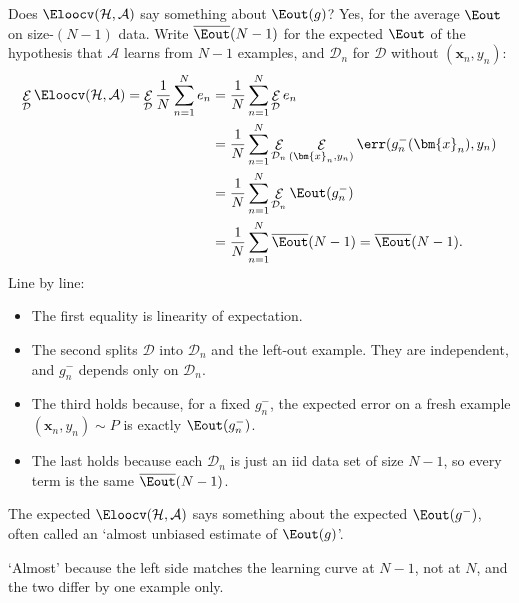 Does \(\Eloocv(\mathcal{H}, \mathcal{A})\) say something about \(\Eout(g)\)?
Yes, for the average \(\Eout\) on size-\((N - 1)\) data. Write
\(\overline{\Eout}(N - 1)\) for the expected \(\Eout\) of the hypothesis that
\(\mathcal{A}\) learns from \(N - 1\) examples, and \(\mathcal{D}_n\) for
\(\mathcal{D}\) without \((\bm{x}_n, y_n)\):
\begin{align*}
    \mathop{\mathcal{E}}_{\mathcal{D}} \Eloocv(\mathcal{H}, \mathcal{A}) =
    \mathop{\mathcal{E}}_{\mathcal{D}} \frac{1}{N} \sum_{n=1}^{N} e_n &=
    \frac{1}{N} \sum_{n=1}^{N} \mathop{\mathcal{E}}_{\mathcal{D}} e_n\\
    &= \frac{1}{N} \sum_{n=1}^{N} \mathop{\mathcal{E}}_{\mathcal{D}_n}
    \mathop{\mathcal{E}}_{(\bm{x}_n, y_n)} \err(g_n^-(\bm{x}_n), y_n)\\
    &= \frac{1}{N} \sum_{n=1}^{N} \mathop{\mathcal{E}}_{\mathcal{D}_n}
    \Eout(g_n^-)\\
    &= \frac{1}{N} \sum_{n=1}^{N} \overline{\Eout}(N - 1) =
    \overline{\Eout}(N - 1) .
\end{align*}
Line by line:
\begin{itemize}
    \item The first equality is linearity of expectation.
    \item The second splits \(\mathcal{D}\) into \(\mathcal{D}_n\) and the
        left-out example. They are independent, and \(g_n^-\) depends only on
        \(\mathcal{D}_n\).
    \item The third holds because, for a fixed \(g_n^-\), the expected error
        on a fresh example \((\bm{x}_n, y_n) \sim P\) is exactly
        \(\Eout(g_n^-)\).
    \item The last holds because each \(\mathcal{D}_n\) is just an iid data
        set of size \(N - 1\), so every term is the same
        \(\overline{\Eout}(N - 1)\).
\end{itemize}

\begin{moral}
    The expected \(\Eloocv(\mathcal{H}, \mathcal{A})\) says something about
    the expected \(\Eout(g^-)\), often called an `almost unbiased estimate
    of \(\Eout(g)\)'.
\end{moral}

`Almost' because the left side matches the learning curve at \(N - 1\), not
at \(N\), and the two differ by one example only.

